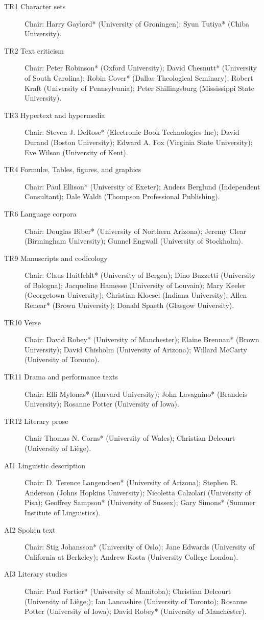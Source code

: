 \begin{description}
\item[{TR1 Character sets}]Chair: Harry Gaylord* (University of Groningen); Syun Tutiya* (Chiba University).
\item[{TR2 Text criticism}]Chair: Peter Robinson* (Oxford University); David Chesnutt* (University of South Carolina); Robin Cover* (Dallas Theological Seminary); Robert Kraft (University of Pennsylvania); Peter Shillingsburg (Mississippi State University).
\item[{TR3 Hypertext and hypermedia}]Chair: Steven J. DeRose* (Electronic Book Technologies Inc); David Durand (Boston University); Edward A. Fox (Virginia State University); Eve Wilson (University of Kent).
\item[{TR4 Formulæ, Tables, figures, and graphics}]Chair: Paul Ellison* (University of Exeter); Anders Berglund (Independent Consultant); Dale Waldt (Thompson Professional Publishing).
\item[{TR6 Language corpora}]Chair: Douglas Biber* (University of Northern Arizona); Jeremy Clear (Birmingham University); Gunnel Engwall (University of Stockholm).
\item[{TR9 Manuscripts and codicology}]Chair: Claus Huitfeldt* (University of Bergen); Dino Buzzetti (University of Bologna); Jacqueline Hamesse (University of Louvain); Mary Keeler (Georgetown University); Christian Kloesel (Indiana University); Allen Renear* (Brown University); Donald Spaeth (Glasgow University).
\item[{TR10 Verse}]Chair: David Robey* (University of Manchester); Elaine Brennan* (Brown University); David Chisholm (University of Arizona); Willard McCarty (University of Toronto).
\item[{TR11 Drama and performance texts}]Chair: Elli Mylonas* (Harvard University); John Lavagnino* (Brandeis University); Rosanne Potter (University of Iowa).
\item[{TR12 Literary prose}]Chair Thomas N. Corns* (University of Wales); Christian Delcourt (University of Liège). 
\item[{AI1 Linguistic description}]Chair: D. Terence Langendoen* (University of Arizona); Stephen R. Anderson (Johns Hopkins University); Nicoletta Calzolari (University of Pisa); Geoffrey Sampson* (University of Sussex); Gary Simons* (Summer Institute of Linguistics).
\item[{AI2 Spoken text}]Chair: Stig Johansson* (University of Oslo); Jane Edwards (University of California at Berkeley); Andrew Rosta (University College London).
\item[{AI3 Literary studies}]Chair: Paul Fortier* (University of Manitoba); Christian Delcourt (University of Liège;); Ian Lancashire (University of Toronto); Rosanne Potter (University of Iowa); David Robey* (University of Manchester).

\end{description}

